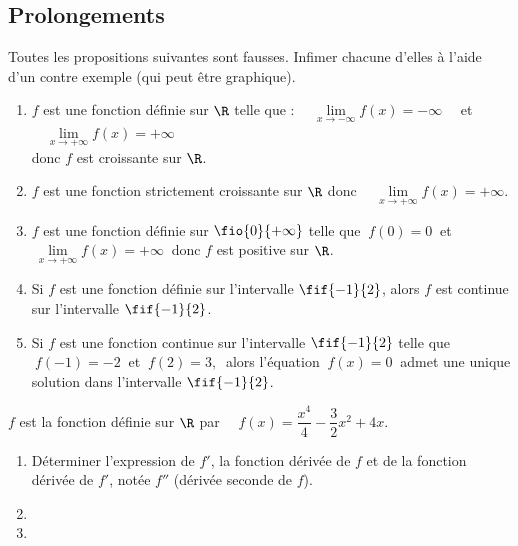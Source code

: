 \documentclass[a4paper,11pt,exos]{nsi} %
\begin{document}
\subsection*{Prolongements}

Toutes les propositions suivantes sont fausses. Infimer chacune d'elles à l'aide d'un contre exemple (qui peut être graphique).
\begin{enumerate}
	\item $f$ est une fonction définie sur $\R$ telle que : $\quad \lim\limits_{x\to-\infty}f(x)=-\infty\quad$ et $\quad \lim\limits_{x\to+\infty}f(x)=+\infty$\\
	donc $f$ est croissante sur $\R$.
	\item $f$ est une fonction strictement croissante sur $\R$ donc $\quad \lim\limits_{x\to+\infty}f(x)=+\infty$.
	\item $f$ est une fonction définie sur $\fio{0}{+\infty}$ telle que $\ f(0)=0\ $ et $\ \lim\limits_{x\to+\infty}f(x)=+\infty\ $ donc $f$ est positive sur $\R$.
	\item Si $f$ est une fonction définie sur l'intervalle $\fif{-1}{2}$, alors $f$ est continue sur l'intervalle $\fif{-1}{2}$.
	\item Si $f$ est une fonction continue sur l'intervalle $\fif{-1}{2}$ telle que $\ f(-1)=-2\ $ et $\ f(2)=3, \ $ alors l'équation $\ f(x)=0\ $ admet une unique solution dans l'intervalle $\fif{-1}{2}$.
\end{enumerate}


\exo{}
$f$ est la fonction définie sur $\R$ par $\quad f(x)=\dfrac{x^4}{4}-\dfrac{3}{2}x^2+4x$.
\begin{enumerate}
	\item Déterminer l'expression de $f'$, la fonction dérivée de $f$ et de la fonction dérivée de $f'$, notée $f''$ (dérivée seconde de $f$).
	\item {}
	\item {}
\end{enumerate}
\end{document}
